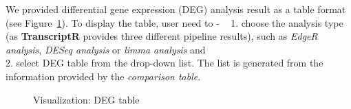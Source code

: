 \documentclass[
  a4paper,
  DIV=11,
  numbers=noendperiod,
  oneside,
  open=any]{scrreport}
\begin{document}
We provided differential gene expression (DEG) analysis result as a
table format (see Figure~\ref{fig-trans8}). To display the table, user
need to - ~ 1. choose the analysis type (as \textbf{TranscriptR}
provides three different pipeline results), such as \emph{EdgeR
analysis}, \emph{DESeq analysis} or \emph{limma analysis} and\\
2. select DEG table from the drop-down list. The list is generated from
the information provided by the \emph{comparison table}.

\begin{figure}[H]


\caption{\label{fig-trans8}Visualization: DEG table}

\end{figure}%
\end{document}
